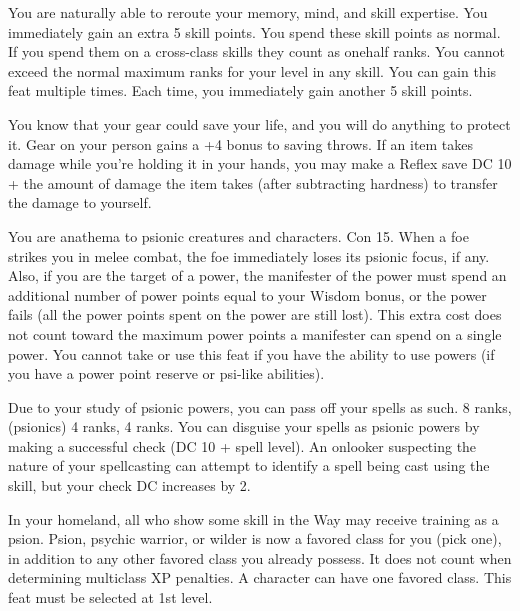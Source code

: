 {You are naturally able to reroute your memory, mind, and skill expertise.}{}
{You immediately gain an extra 5 skill points. You spend these skill points as normal. If you spend them on a cross-class skills they count as onehalf ranks. You cannot exceed the normal maximum ranks for your level in any skill.}{}
{You can gain this feat multiple times. Each time, you immediately gain another 5 skill points.}

{You know that your gear could save your life, and you will do anything to protect it.}{}
{Gear on your person gains a +4 bonus to saving throws. If an item takes damage while you're holding it in your hands, you may make a Reflex save DC 10 + the amount of damage the item takes (after subtracting hardness) to transfer the damage to yourself.}{}{}

{You are anathema to psionic creatures and characters.}
{Con 15.}
{When a foe strikes you in melee combat, the foe immediately loses its psionic focus, if any. Also, if you are the target of a power, the manifester of the power must spend an additional number of power points equal to your Wisdom bonus, or the power fails (all the power points spent on the power are still lost). This extra cost does not count toward the maximum power points a manifester can spend on a single power.}{}
{You cannot take or use this feat if you have the ability to use powers (if you have a power point reserve or psi-like abilities).}

{Due to your study of psionic powers, you can pass off your spells as such.}
{ 8 ranks,  (psionics) 4 ranks,  4 ranks.}
{You can disguise your spells as psionic powers by making a successful  check (DC 10 + spell level). An onlooker suspecting the nature of your spellcasting can attempt to identify a spell being cast using the  skill, but your check DC increases by 2.}{}{}

{In your homeland, all who show some skill in the Way may receive training as a psion.}{}
{Psion, psychic warrior, or wilder is now a favored class for you (pick one), in addition to any other favored class you already possess. It does not count when determining multiclass XP penalties.}
{A character can have one favored class.}
{This feat must be selected at 1st level.}

